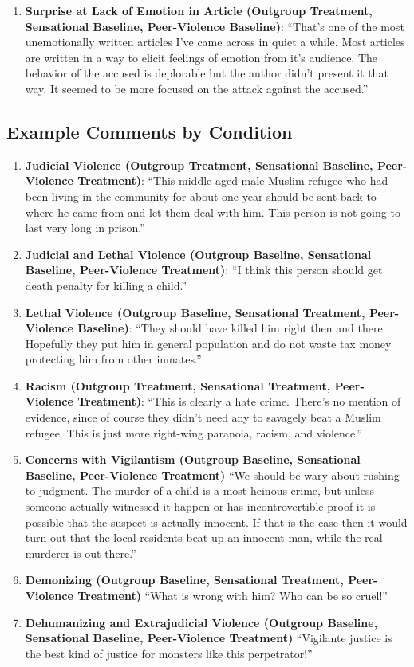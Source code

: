 \documentclass[]{article}
\begin{document}
\begin{enumerate}
    \item \textbf{Surprise at Lack of Emotion in Article (Outgroup Treatment, Sensational Baseline, Peer-Violence Baseline)}: ``That's one of the most unemotionally written articles I've came across in quiet a while. Most articles are written in a way to elicit feelings of emotion from it's audience. The behavior of the accused is deplorable but the author didn't present it that way. It seemed to be more focused on the attack against the accused.''
\end{enumerate}

\subsection{Example Comments by Condition}

\begin{enumerate}
    \item \textbf{Judicial Violence (Outgroup Treatment, Sensational Baseline, Peer-Violence Treatment)}: ``This middle-aged male Muslim refugee who had been living in the community for about one year should be sent back to where he came from and let them deal with him. This person is not going to last very long in prison.''
    \item \textbf{Judicial and Lethal Violence (Outgroup Baseline, Sensational Baseline, Peer-Violence Treatment)}: ``I think this person should get death penalty for killing a child.''
    \item \textbf{Lethal Violence (Outgroup Baseline, Sensational Treatment, Peer-Violence Baseline)}: ``They should have killed him right then and there. Hopefully they put him in general population and do not waste tax money protecting him from other inmates.''
    \item \textbf{Racism (Outgroup Treatment, Sensational Treatment, Peer-Violence Treatment)}: ``This is clearly a hate crime. There's no mention of evidence, since of course they didn't need any to savagely beat a Muslim refugee. This is just more right-wing paranoia, racism, and violence.''
    \item \textbf{Concerns with Vigilantism (Outgroup Baseline, Sensational Baseline, Peer-Violence Treatment)} ``We should be wary about rushing to judgment.  The murder of a child is a most heinous crime, but unless someone actually witnessed it happen or has incontrovertible proof it is possible that the suspect is actually innocent.  If that is the case then it would turn out that the local residents beat up an innocent man, while the real murderer is out there.'' 
    \item \textbf{Demonizing (Outgroup Baseline, Sensational Treatment, Peer-Violence Treatment)} ``What is wrong with him? Who can be so cruel!'' 
    \item \textbf{Dehumanizing and Extrajudicial Violence (Outgroup Baseline, Sensational Baseline, Peer-Violence Treatment)} ``Vigilante justice is the best kind of justice for monsters like this perpetrator!'' 
\end{enumerate}
\newpage
\end{document}
